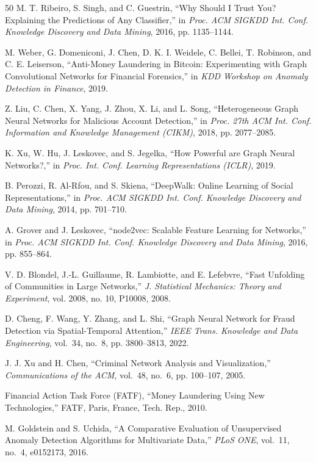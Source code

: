 \documentclass[conference]{IEEEtran}
\begin{document}
\begin{thebibliography}{50}
M. T. Ribeiro, S. Singh, and C. Guestrin, ``Why Should I Trust You? Explaining the Predictions of Any Classifier,'' in \textit{Proc. ACM SIGKDD Int. Conf. Knowledge Discovery and Data Mining}, 2016, pp. 1135--1144.

M. Weber, G. Domeniconi, J. Chen, D. K. I. Weidele, C. Bellei, T. Robinson, and C. E. Leiserson, ``Anti-Money Laundering in Bitcoin: Experimenting with Graph Convolutional Networks for Financial Forensics,'' in \textit{KDD Workshop on Anomaly Detection in Finance}, 2019.

Z. Liu, C. Chen, X. Yang, J. Zhou, X. Li, and L. Song, ``Heterogeneous Graph Neural Networks for Malicious Account Detection,'' in \textit{Proc. 27th ACM Int. Conf. Information and Knowledge Management (CIKM)}, 2018, pp. 2077--2085.

K. Xu, W. Hu, J. Leskovec, and S. Jegelka, ``How Powerful are Graph Neural Networks?,'' in \textit{Proc. Int. Conf. Learning Representations (ICLR)}, 2019.

B. Perozzi, R. Al-Rfou, and S. Skiena, ``DeepWalk: Online Learning of Social Representations,'' in \textit{Proc. ACM SIGKDD Int. Conf. Knowledge Discovery and Data Mining}, 2014, pp. 701--710.

A. Grover and J. Leskovec, ``node2vec: Scalable Feature Learning for Networks,'' in \textit{Proc. ACM SIGKDD Int. Conf. Knowledge Discovery and Data Mining}, 2016, pp. 855--864.

V. D. Blondel, J.-L. Guillaume, R. Lambiotte, and E. Lefebvre, ``Fast Unfolding of Communities in Large Networks,'' \textit{J. Statistical Mechanics: Theory and Experiment}, vol. 2008, no. 10, P10008, 2008.

D. Cheng, F. Wang, Y. Zhang, and L. Shi, ``Graph Neural Network for Fraud Detection via Spatial-Temporal Attention,'' \textit{IEEE Trans. Knowledge and Data Engineering}, vol.~34, no.~8, pp. 3800--3813, 2022.

J. J. Xu and H. Chen, ``Criminal Network Analysis and Visualization,'' \textit{Communications of the ACM}, vol.~48, no.~6, pp. 100--107, 2005.

Financial Action Task Force (FATF), ``Money Laundering Using New Technologies,'' FATF, Paris, France, Tech. Rep., 2010.

M. Goldstein and S. Uchida, ``A Comparative Evaluation of Unsupervised Anomaly Detection Algorithms for Multivariate Data,'' \textit{PLoS ONE}, vol.~11, no.~4, e0152173, 2016.


\end{thebibliography}
\end{document}
